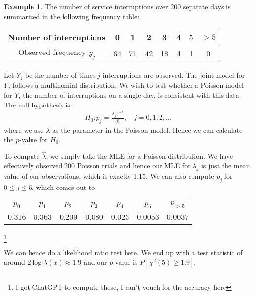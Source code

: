 \documentclass[11pt]{amsart}
\theoremstyle{definition}
\newtheorem{example}[theorem]{Example}
\numberwithin{equation}{section}
\begin{document}
\begin{example}
    The number of service interruptions over 200 separate days is summarized in the following frequency table:
    \begin{center}
        \begin{tabular}{c|c|c|c|c|c|c|c}
            Number of interruptions & 0 & 1 & 2 & 3 & 4 & 5 & $>5$ \\
            \hline
            Observed frequency $y_j$ & 64 & 71 & 42 & 18 & 4 & 1 & 0\\
        \end{tabular}
    \end{center}
    Let $Y_j$ be the number of times $j$ interruptions are observed. The joint model for $Y_j$ follows a multinomial distribution. We wish to test whether a Poisson model for $Y$, the number of interruptions on a single day, is consistent with this data. The null hypothesis is:
    \begin{align*}
        H_0:p_j=\frac{\lambda_je^{-\lambda}}{j!},\quad j=0,1,2,\ldots
    \end{align*}
    where we use $\lambda$ as the parameter in the Poisson model. Hence we can calculate the $p$-value for $H_0$.

    To compute $\hat\lambda$, we simply take the MLE for a Poisson distribution. We have effectively observed 200 Poisson trials and hence our MLE for $\lambda_j$ is just the mean value of our observations, which is exactly 1.15. We can also compute $p_j$ for $0\le j\le 5$, which comes out to
    \begin{center}
        \begin{tabular}{c|c|c|c|c|c|c}
            $p_0$ & $p_1$ & $p_2$ & $p_3$ & $p_4$ & $p_5$ & $p_{>5}$ \\
            0.316 & 0.363 & 0.209 & 0.080 & 0.023 & 0.0053 & 0.0037
        \end{tabular}\footnote{I got ChatGPT to compute these, I can't vouch for the accuracy here}
    \end{center}
    We can hence do a likelihood ratio test here. We end up with a test statistic of around $2\log\lambda(x)\approx 1.9$ and our $p$-value is $P[\chi^2(5)\ge 1.9]$.
\end{example}
\end{document}
